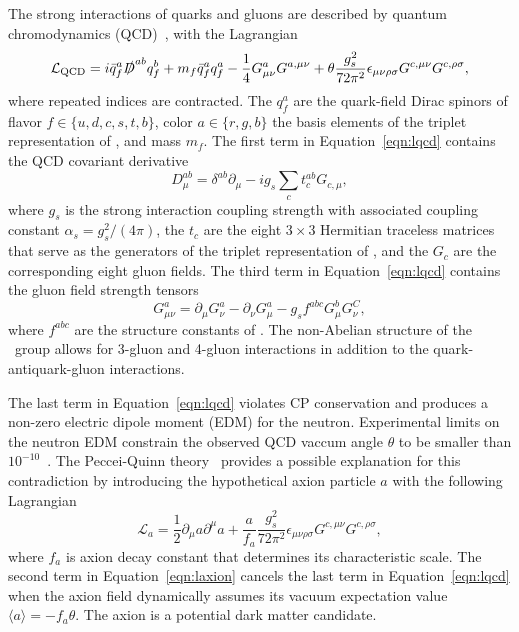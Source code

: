 The strong interactions of quarks and gluons are described by quantum chromodynamics (QCD)~\cite{Gross1973, Politzer1973}, with the Lagrangian
\begin{equation}
  \label{eqn:lqcd}
  \mathcal{L}_{\text{QCD}} = i \bar q_f^a \slashed D^{ab} q_f^b + m_f \bar q_f^a q_f^a - \frac{1}{4} G_{\mu\nu}^a G^{a,\mu\nu} + \theta \frac{g_s^2}{72\pi^2} \epsilon_{\mu\nu\rho\sigma} G^{c,\mu\nu} G^{c, \rho\sigma},
\end{equation}
where repeated indices are contracted.
The $q_f^a$ are the quark-field Dirac spinors of flavor $f \in \{u,d,c,s,t,b\}$, color $a \in \{r,g,b\}$ the basis elements of the triplet representation of \suthree, and mass $m_f$.
The first term in Equation~\ref{eqn:lqcd} contains the QCD covariant derivative
\begin{equation}
  D_{\mu}^{ab} = \delta^{ab} \partial_\mu - i g_s \sum_{c} t_c^{ab} G_{c,\mu},
\end{equation}
where $g_s$ is the strong interaction coupling strength with associated coupling constant $\alpha_s = g_s^2/(4\pi)$, the $t_c$ are the eight $3\times3$ Hermitian traceless matrices that serve as the generators of the triplet representation of \suthree, and the $G_c$ are the corresponding eight gluon fields.
The third term in Equation~\ref{eqn:lqcd} contains the gluon field strength tensors
\begin{equation}
  G_{\mu\nu}^a = \partial_\mu G_\nu^a - \partial_\nu G_\mu^a - g_s f^{abc} G_\mu^b G_\nu^C,
\end{equation}
where $f^{abc}$ are the structure constants of \suthree.
The non-Abelian structure of the \suthree\ group allows for 3-gluon and 4-gluon interactions in addition to the quark-antiquark-gluon interactions.

The last term in Equation~\ref{eqn:lqcd} violates CP conservation and produces a non-zero electric dipole moment (EDM) for the neutron.
Experimental limits on the neutron EDM constrain the observed QCD vaccum angle $\theta$ to be smaller than $10^{-10}$~\cite{PDG2018}.
The Peccei-Quinn theory~\cite{Quinn1977, Peccei2008} provides a possible explanation for this contradiction by introducing the hypothetical axion particle $a$ with the following Lagrangian
\begin{equation}
  \label{eqn:laxion}
  \mathcal{L}_a = \frac{1}{2} \partial_\mu a \partial^\mu a + \frac{a}{f_a} \frac{g_s^2}{72 \pi^2} \epsilon_{\mu\nu\rho\sigma} G^{c,\mu\nu} G^{c, \rho\sigma},
\end{equation}
where $f_a$ is axion decay constant that determines its characteristic scale.
The second term in Equation~\ref{eqn:laxion} cancels the last term in Equation~\ref{eqn:lqcd} when the axion field dynamically assumes its vacuum expectation value $\langle a \rangle = - f_a \theta$.
The axion is a potential dark matter candidate.

